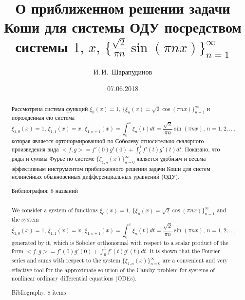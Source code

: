 \documentclass{article}
\numberwithin{equation}{section}
\theoremstyle{plain}
\theoremstyle{definition}
\begin{document}
\title{О приближенном решении задачи Коши для системы ОДУ посредством системы
$1,\, x,\, \{\frac{\sqrt{2}}{\pi n}\sin(\pi nx)\}_{n=1}^\infty$}



\author[I.\,I.~Sharapudinov]{И.\,И.~Шарапудинов}

\address{Дагестанский научный центр РАН\\
Владикавказский научный центр РАН }



\date{07.06.2018}

\maketitle

\begin{fulltext}


\begin{abstract}
Рассмотрена система функций  $\xi_0(x)=1,\, \{\xi_n(x)=\sqrt{2}\cos(\pi nx)\}_{n=1}^\infty$ и порожденная ею система
$$
 \xi_{1,0}(x)=1,\, \xi_{1,1}(x)=x,\, \xi_{1,n+1}(x)=\int_0^x \xi_{n}(t)dt=\frac{\sqrt{2}}{\pi n}\sin(\pi nx),\, n=1,2,\ldots,
$$
 которая является ортонормированной по Соболеву относительно скалярного произведения  вида $<f,g>=f'(0)g'(0)+\int_{0}^{1}f'(t)g'(t)dt$. Показано, что ряды и суммы Фурье по системе $\{\xi_{1,n}(x)\}_{n=0}^\infty$  является удобным и весьма эффективным инструментом приближенного решения задачи Коши для систем нелинейных обыкновенных дифференциальных уравнений (ОДУ).

Библиография:  8 названий

$$$$

We consider a system of functions $\xi_0(x)=1,\, \{\xi_n(x)=\sqrt{2}\cos(\pi nx)\}_{n=1}^\infty$ and the system 
$$
\xi_{1,0}(x)=1,\, \xi_{1,1}(x)=x,\, \xi_{1,n+1}(x)=\int_0^x \xi_{n}(t)dt=\frac{\sqrt{2}}{\pi n}\sin(\pi nx),\, n=1,2,\ldots,
$$
generated by it, which is Sobolev orthonormal with respect to a scalar product of the form $<f,g>=f'(0)g'(0)+\int_{0}^{1}f'(t)g'(t)dt$. It is shown that the Fourier series and sums with respect to the system $\{\xi_{1,n}(x)\}_{n=0}^\infty$ are a convenient and very effective tool for the approximate solution of the Cauchy problem for systems of nonlinear ordinary differential equations (ODEs).

Bibliography: 8 items

\end{abstract}


\end{fulltext}
\end{document}

